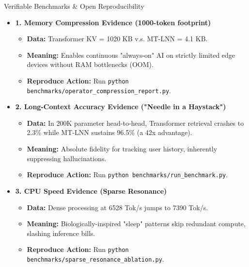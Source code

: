 ﻿\documentclass[aspectratio=169, 10pt]{beamer}
\begin{document}
\begin{frame}{Verifiable Benchmarks \& Open Reproducibility}
\begin{itemize}
    \item \textbf{1. Memory Compression Evidence (1000-token footprint)}
    \begin{itemize}
        \item \textbf{Data:} Transformer KV = 1020 KB v.s. MT-LNN = 4.1 KB.
        \item \textbf{Meaning:} Enables continuous "always-on" AI on strictly limited edge devices without RAM bottlenecks (OOM).
        \item \textbf{Reproduce Action:} Run \texttt{python benchmarks/operator\_compression\_report.py}.
    \end{itemize}
    \vspace{0.4em}
    \item \textbf{2. Long-Context Accuracy Evidence ("Needle in a Haystack")}
    \begin{itemize}
        \item \textbf{Data:} In 200K parameter head-to-head, Transformer retrieval crashes to 2.3\% while MT-LNN sustains 96.5\% (a 42x advantage).
        \item \textbf{Meaning:} Absolute fidelity for tracking user history, inherently suppressing hallucinations.
        \item \textbf{Reproduce Action:} Run \texttt{python benchmarks/run\_benchmark.py}.
    \end{itemize}
    \vspace{0.4em}
    \item \textbf{3. CPU Speed Evidence (Sparse Resonance)}
    \begin{itemize}
        \item \textbf{Data:} Dense processing at 6528 Tok/s jumps to 7390 Tok/s.
        \item \textbf{Meaning:} Biologically-inspired "sleep" patterns skip redundant compute, slashing inference bills.
        \item \textbf{Reproduce Action:} Run \texttt{python benchmarks/sparse\_resonance\_ablation.py}.
    \end{itemize}
\end{itemize}
\end{frame}
\end{document}
